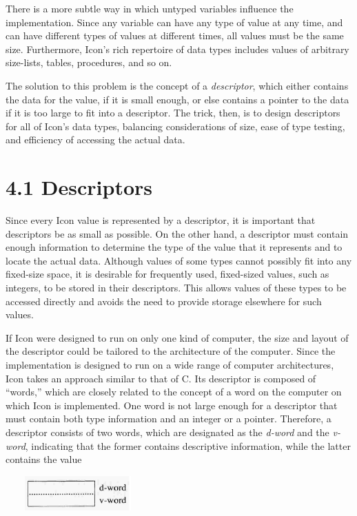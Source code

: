 There is a more subtle way in which untyped variables influence the
implementation. Since any variable can have any type of value at any
time, and can have different types of values at different times, all
values must be the same size.  Furthermore, Icon's rich repertoire of
data types includes values of arbitrary size-lists, tables,
procedures, and so on.

The solution to this problem is the concept of a \textit{descriptor},
which either contains the data for the value, if it is small enough,
or else contains a pointer to the data if it is too large to fit into
a descriptor. The trick, then, is to design descriptors for all of
Icon's data types, balancing considerations of size, ease of type
testing, and efficiency of accessing the actual data.


\section[4.1 Descriptors]{4.1 Descriptors}

Since every Icon value is represented by a descriptor, it is important
that descriptors be as small as possible. On the other hand, a
descriptor must contain enough information to determine the type of
the value that it represents and to locate the actual data. Although
values of some types cannot possibly fit into any fixed-size space, it
is desirable for frequently used, fixed-sized values, such as
integers, to be stored in their descriptors. This allows values of
these types to be accessed directly and avoids the need to provide
storage elsewhere for such values.

If Icon were designed to run on only one kind of computer, the size
and layout of the descriptor could be tailored to the architecture of
the computer. Since the implementation is designed to run on a wide
range of computer architectures, Icon takes an approach similar to
that of C. Its descriptor is composed of ``words,'' which are closely
related to the concept of a word on the computer on which Icon is
implemented. One word is not large enough for a descriptor that must
contain both type information and an integer or a pointer. Therefore,
a descriptor consists of two words, which are designated as the
\textit{d-word} and the \textit{v-word}, indicating that the former
contains descriptive information, while the latter contains the value


\ \ \ \  \includegraphics[width=1.602in,height=0.5201in]{ib-img/ib-img005.jpg} 


